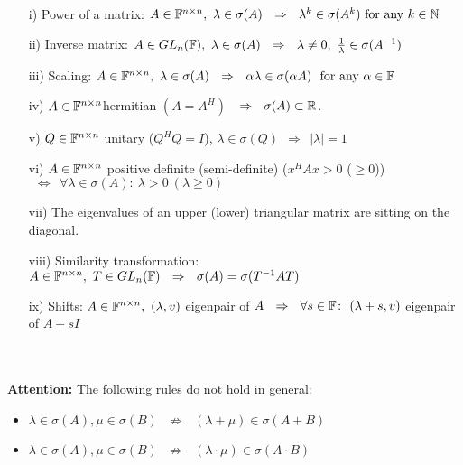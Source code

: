 \begin{frame}
\begin{lemma}\label{lem:properties_eigenvalues}~\\[-0.1cm]
	\begin{itemize}
	\item[\color{satzrot}i)]Power of a matrix: $A \in {\mathbb{F}}^{n\times n} ,~\lambda \in \sigma(A) ~~\Rightarrow~~  \lambda^k \in \sigma(A^k)~\text{for any}~k\in {\mathbb{N}}$ 
	\vspace{0.2cm}\item[\color{satzrot}ii)] Inverse matrix: $A \in GL_n({\mathbb{F}}),~\lambda \in \sigma(A) ~~\Rightarrow~~ \lambda\neq 0,~\frac{1}{\lambda} \in \sigma(A^{-1})~$
	\vspace{0.2cm}\item[\color{satzrot}iii)]Scaling: $A \in {\mathbb{F}}^{n\times n},~\lambda \in \sigma(A)~~\Rightarrow~~\alpha \lambda \in \sigma(\alpha A) ~~\text{for any} ~\alpha \in {\mathbb{F}}$
	\vspace{0.2cm}\item[\color{satzrot}iv)] $A \in {\mathbb{F}}^{n\times n}$hermitian $(A = A^H)$ $~~\Rightarrow~~ \sigma(A)\subset{\mathbb{R}}$.
	\vspace{0.2cm}\item[\color{satzrot}v)]  $Q \in {\mathbb{F}}^{n\times n}$ unitary ($Q^HQ=I$), $\lambda \in \sigma(Q) ~~\Rightarrow~~|\lambda|=1$
	\vspace{0.2cm}\item[\color{satzrot}vi)] $A \in {\mathbb{F}}^{n\times n}$ positive definite (semi-definite) ($x^HAx>0$ ($\geq 0$)) $~~\Leftrightarrow~~\forall \lambda \in \sigma(A)\colon~ \lambda > 0~  (\lambda \geq 0)$
	\vspace{0.2cm}\item[\color{satzrot}vii)] The eigenvalues of an upper (lower) triangular matrix are sitting on the diagonal.
	\vspace{0.2cm}\item[\color{satzrot}viii)] Similarity transformation: $A \in {\mathbb{F}}^{n\times n}, ~T \in GL_n({\mathbb{F}}) ~~\Rightarrow~~ \sigma(A) = \sigma(T^{-1}AT)$
	\vspace{0.2cm}\item[\color{satzrot}ix)] Shifts: $A \in {\mathbb{F}}^{n\times n},~ (\lambda, v)$ eigenpair of $A  ~~\Rightarrow~~ \forall s\in{\mathbb{F}} \colon ~ (\lambda+s, v)$ eigenpair of $A+sI$	
\end{itemize}
\end{lemma}


~\\~\\
\textbf{Attention:} The following rules do not hold in general:\\[-0.1cm]
\begin{itemize}
	\item $\lambda \in \sigma(A), \mu \in \sigma(B)~~~\nRightarrow~~~(\lambda + \mu) \in \sigma(A+B)$
	\item $\lambda \in \sigma(A), \mu \in \sigma(B)~~~\nRightarrow~~~(\lambda \cdot \mu) \in \sigma(A\cdot B)$
\end{itemize}
\end{frame}



